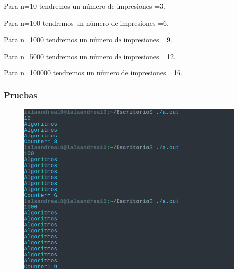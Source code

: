 \documentclass[12pt, fleqn]{article}                             %
\theoremstyle{break}                                            %
\begin{document}
    Para n=10 tendremos un número de impresiones =3.

    Para n=100 tendremos un número de impresiones =6.

    Para n=1000 tendremos un número de impresiones =9.

    Para n=5000 tendremos un número de impresiones =12.

    Para n=100000 tendremos un número de impresiones =16.

    \subsubsection{Pruebas}
    
    \begin{figure}[H]
               \centering
                \includegraphics[scale=.5]{10-1000.png}
            \end{figure}
\end{document}
